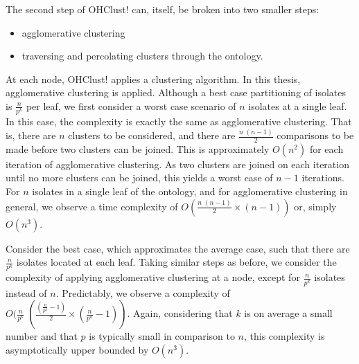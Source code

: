 \documentclass[12pt]{ucthesis}
\begin{document}
      The second step of \textsf{OHClust!} can, itself, be broken into two
      smaller steps:
      \begin{itemize}
         \item \textsf{agglomerative clustering}
         \item traversing and percolating clusters through the ontology.
      \end{itemize}
      At each node, \textsf{OHClust!} applies a clustering algorithm. In this
      thesis, \textsf{agglomerative clustering} is applied. Although a best
      case partitioning of isolates is $\frac{n}{p^{k}}$ per leaf, we first
      consider a worst case scenario of $n$ isolates at a single leaf. In this
      case, the complexity is exactly the same as agglomerative clustering.
      That is, there are $n$ clusters to be considered, and there are
      $\frac{n\;(n-1)}{2}$ comparisons to be made before two clusters can
      be joined. This is approximately $O(n^2)$ for each iteration of
      \textsf{agglomerative clustering}. As two clusters are joined on each
      iteration until no more clusters can be joined, this yields a worst case
      of $n-1$ iterations. For $n$ isolates in a single leaf of the ontology,
      and for \textsf{agglomerative clustering} in general, we observe a time
      complexity of $O(\frac{n\;(n - 1)}{2} \times (n - 1))$ or, simply
      $O(n^{3})$.

      Consider the best case, which approximates the average case, such that
      there are $\frac{n}{p^{k}}$ isolates located at each leaf. Taking
      similar steps as before, we consider the complexity of applying
      \textsf{agglomerative clustering} at a node, except for $\frac{n}{p^{k}}$
      isolates instead of $n$. Predictably, we observe a complexity of
      $O(\frac{n}{p^{k}}\;(\frac{(\frac{n}{p^{k}} - 1)}{2} \times
      (\frac{n}{p^{k}} - 1))$. Again, considering that $k$ is on average a
      small number and that $p$ is typically small in comparison to $n$, this
      complexity is asymptotically upper bounded by $O(n^{3})$.
\end{document}
